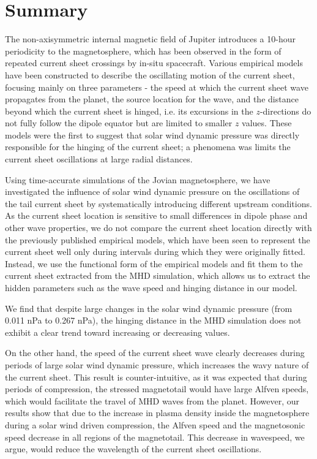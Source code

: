 \section{Summary}

The non-axisymmetric internal magnetic field of Jupiter introduces a 10-hour periodicity to the magnetosphere, which has been observed in the form of repeated current sheet crossings by in-situ spacecraft. Various empirical models have been constructed to describe the oscillating motion of the current sheet, focusing mainly on three parameters - the speed at which the current sheet wave propagates from the planet, the source location for the wave, and the distance beyond which the current sheet is hinged, i.e. its excursions in the $z$-directions do not fully follow the dipole equator but are limited to smaller $z$ values. These models were the first to suggest that solar wind dynamic pressure was directly responsible for the hinging of the current sheet; a phenomena was limits the current sheet oscillations at large radial distances. 

Using time-accurate simulations of the Jovian magnetosphere, we have investigated the influence of solar wind dynamic pressure on the oscillations of the tail current sheet by systematically introducing different upstream conditions. As the current sheet location is sensitive to small differences in dipole phase and other wave properties, we do not compare the current sheet location directly with the previously published empirical models, which have been seen to represent the current sheet well only during intervals during which they were originally fitted. Instead, we use the functional form of the empirical models and fit them to the current sheet extracted from the MHD simulation, which allows us to extract the hidden parameters such as the wave speed and hinging distance in our model. 

We find that despite large changes in the solar wind dynamic pressure (from 0.011 nPa to 0.267 nPa), the hinging distance in the MHD simulation does not exhibit a clear trend toward increasing or decreasing values. 

On the other hand, the speed of the current sheet wave clearly decreases during periods of large solar wind dynamic pressure, which increases the wavy nature of the current sheet. This result is counter-intuitive, as it was expected that during periods of compression, the stressed magnetotail would have large Alfven speeds, which would facilitate the travel of MHD waves from the planet. However, our results show that due to the increase in plasma density inside the magnetosphere during a solar wind driven compression, the Alfven speed and the magnetosonic speed decrease in all regions of the magnetotail. This decrease in wavespeed, we argue, would reduce the wavelength of the current sheet oscillations. 
